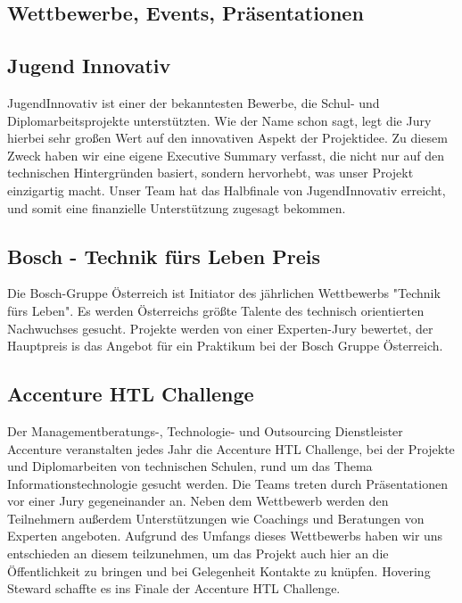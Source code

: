   \subsection{Wettbewerbe, Events, Präsentationen}

    \subsection*{Jugend Innovativ}
    {JugendInnovativ\cite{jugendinnovativ}} ist einer der bekanntesten Bewerbe, die Schul- und Diplomarbeitsprojekte
    unterstützten. Wie der Name schon sagt, legt die Jury hierbei sehr großen Wert auf den innovativen
    Aspekt der Projektidee. Zu diesem Zweck haben wir eine eigene Executive Summary verfasst, die nicht
    nur auf den technischen Hintergründen basiert, sondern hervorhebt, was unser Projekt einzigartig
    macht. Unser Team hat das Halbfinale von JugendInnovativ erreicht, und somit eine finanzielle Unterstützung
    zugesagt bekommen.

    \subsection*{Bosch - Technik fürs Leben Preis}
    Die Bosch-Gruppe Österreich ist Initiator des jährlichen Wettbewerbs {"Technik fürs Leben"\cite{bosch}}. Es werden Österreichs
    größte Talente des technisch orientierten Nachwuchses gesucht. Projekte werden von einer Experten-Jury bewertet,
    der Hauptpreis is das Angebot für ein Praktikum bei der Bosch Gruppe Österreich.

    \subsection*{Accenture HTL Challenge}
    Der Managementberatungs-, Technologie- und Outsourcing Dienstleister {Accenture\cite{accenture}} veranstalten jedes Jahr die Accenture HTL Challenge,
    bei der Projekte und Diplomarbeiten von technischen Schulen, rund um das Thema Informationstechnologie gesucht werden.
    Die Teams treten durch Präsentationen vor einer Jury gegeneinander an. Neben dem Wettbewerb werden den Teilnehmern außerdem
    Unterstützungen wie Coachings und Beratungen von Experten angeboten. Aufgrund des Umfangs dieses Wettbewerbs haben wir uns entschieden an diesem teilzunehmen,
    um das Projekt auch hier an die Öffentlichkeit zu bringen und bei Gelegenheit Kontakte zu knüpfen. Hovering Steward schaffte es ins Finale der
    Accenture HTL Challenge.

